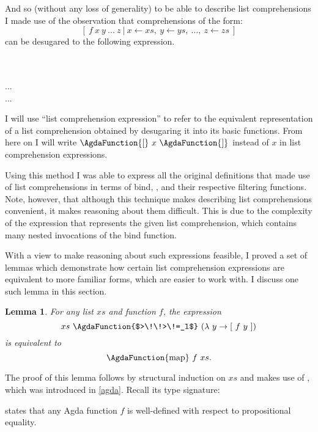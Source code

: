 \documentclass[12pt,a4paper,twoside,openright]{report}
\newcommand{\F}{\AgdaFunction}
\newtheorem{lemma}{Lemma}[section]
\begin{document}
And so (without any loss of generality) to be able to describe list comprehensions I made use of the observation that comprehensions of the form:
$$[\ f\ x\ y\ ...\ z\ |\ x \leftarrow xs,\ y \leftarrow ys,\ ...,\ z \leftarrow zs\ ]$$
can be desugared to the following expression.

\begin{code}
\>    \<%
\\
\>    \<%
\\
\>...
\\
\>      \AgdaSymbol{(}   ...\ \<%
\end{code}

I will use ``list comprehension expression'' to refer to the equivalent representation of a list comprehension obtained by desugaring it into its basic functions. From here on I will write $\F{[}\ x\ \F{]}$ instead of \F{return} $x$ in list comprehension expressions.

Using this method I was able to express all the original definitions that made use of list comprehensions in terms of bind, \F{return}, and their respective filtering functions. Note, however, that although this technique makes describing list comprehensions convenient, it makes reasoning about them difficult. This is due to the complexity of the expression that represents the given list comprehension, which contains many nested invocations of the bind function.

With a view to make reasoning about such expressions feasible, I proved a set of lemmas which demonstrate how certain list comprehension expressions are equivalent to more familiar forms, which are easier to work with. I discuss one such lemma in this section.

\begin{lemma}
For any list $xs$ and function $f$, the expression
$$xs\ \F{$>\!\!>\!=_l$}\ (\lambda\ y \to [\ f\ y\ ])$$
is equivalent to
$$\text{\F{map}}\ f\ xs.$$
\end{lemma}
The proof of this lemma follows by structural induction on $xs$ and makes use of \F{cong}, which was introduced in \autoref{agda}. Recall its type signature:

\begin{code}%
\> \AgdaSymbol{:} \AgdaSymbol{\{}  \AgdaSymbol{:} \AgdaSymbol{\}}  \AgdaSymbol{\{}  \AgdaSymbol{:} \AgdaSymbol{\}}  \AgdaSymbol{(} \AgdaSymbol{:}   \AgdaSymbol{)}          \<%
\end{code}
\F{cong} states that any Agda function $f$ is well-defined with respect to propositional equality.
\end{document}
